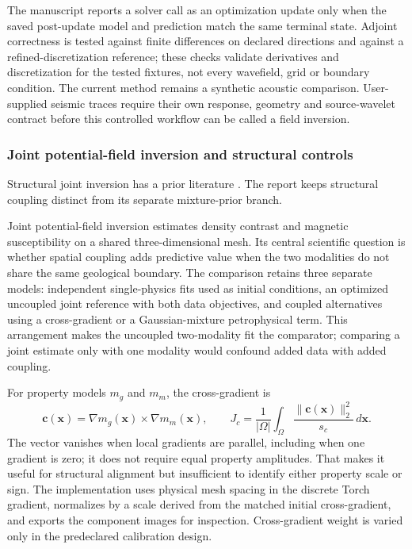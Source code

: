 The manuscript reports a solver call as an optimization update only
when the saved post-update model and prediction match the same terminal
state. Adjoint correctness is tested against finite differences on
declared directions and against a refined-discretization reference;
these checks validate derivatives and discretization for the tested
fixtures, not every wavefield, grid or boundary condition. The current
method remains a synthetic acoustic comparison. User-supplied seismic
traces require their own response, geometry and source-wavelet contract
before this controlled workflow can be called a field inversion.

\subsubsection{Joint potential-field inversion and structural controls}

Structural joint inversion has a prior literature \cite{haber1997,simpegJoint,astic2020}. The report keeps structural coupling distinct from its separate mixture-prior branch.\label{method-joint}

Joint potential-field inversion estimates density contrast and magnetic susceptibility on a shared
three-dimensional mesh. Its central scientific question is whether
spatial coupling adds predictive value when the two modalities do not
share the same geological boundary. The comparison retains three
separate models: independent single-physics fits used as initial
conditions, an optimized uncoupled joint reference with both data
objectives, and coupled alternatives using a cross-gradient or a
Gaussian-mixture petrophysical term. This arrangement makes the
uncoupled two-modality fit the comparator; comparing a joint estimate
only with one modality would confound added data with added coupling.

For property models \(m_g\) and \(m_m\), the cross-gradient is
\begin{equation}\label{eq:cross-gradient}
 \mathbf{c}(\mathbf{x})=
 \nabla m_g(\mathbf{x})\times\nabla m_m(\mathbf{x}),\qquad
 J_c=\frac{1}{|\Omega|}\int_{\Omega}
 \frac{\|\mathbf{c}(\mathbf{x})\|_2^2}{s_c}\,d\mathbf{x}.
\end{equation}
The vector vanishes when local gradients are parallel, including when
one gradient is zero; it does not require equal property amplitudes.
That makes it useful for structural alignment but insufficient to
identify either property scale or sign. The implementation uses physical
mesh spacing in the discrete Torch gradient, normalizes by a scale
derived from the matched initial cross-gradient, and exports the
component images for inspection. Cross-gradient weight is varied only
in the predeclared calibration design.

